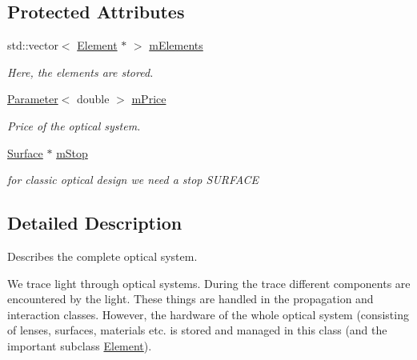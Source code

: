 \subsection*{Protected Attributes}
\begin{DoxyCompactItemize}
\item 
std\+::vector$<$ \hyperlink{classElement}{Element} $\ast$ $>$ \hyperlink{classOpticalSystem_a631ce48d96804db9cffcc0820bd58c09}{m\+Elements}\hypertarget{classOpticalSystem_a631ce48d96804db9cffcc0820bd58c09}{}\label{classOpticalSystem_a631ce48d96804db9cffcc0820bd58c09}

\begin{DoxyCompactList}\small\item\em Here, the elements are stored. \end{DoxyCompactList}\item 
\hyperlink{classParameter}{Parameter}$<$ double $>$ \hyperlink{classOpticalSystem_ae27cdbd3c25a95204813bc0f8da69bd3}{m\+Price}\hypertarget{classOpticalSystem_ae27cdbd3c25a95204813bc0f8da69bd3}{}\label{classOpticalSystem_ae27cdbd3c25a95204813bc0f8da69bd3}

\begin{DoxyCompactList}\small\item\em Price of the optical system. \end{DoxyCompactList}\item 
\hyperlink{classSurface}{Surface} $\ast$ \hyperlink{classOpticalSystem_a98b21335a43785df339f04c7e05100d5}{m\+Stop}\hypertarget{classOpticalSystem_a98b21335a43785df339f04c7e05100d5}{}\label{classOpticalSystem_a98b21335a43785df339f04c7e05100d5}

\begin{DoxyCompactList}\small\item\em for classic optical design we need a stop S\+U\+R\+F\+A\+CE \end{DoxyCompactList}\end{DoxyCompactItemize}


\subsection{Detailed Description}
Describes the complete optical system. 

We trace light through optical systems. During the trace different components are encountered by the light. These things are handled in the propagation and interaction classes. However, the hardware of the whole optical system (consisting of lenses, surfaces, materials etc. is stored and managed in this class (and the important subclass \hyperlink{classElement}{Element}).

